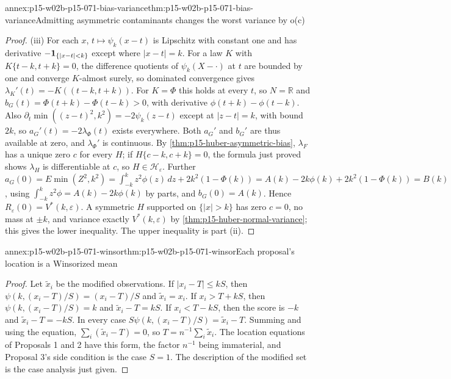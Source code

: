 \begin{annexitem}{annex:p15-w02b-p15-071-bias-variance}{thm:p15-w02b-p15-071-bias-variance}{Admitting asymmetric contaminants changes the worst variance by o(c)}
\begin{proof}
(iii) For each \(x\), \(t\mapsto\psi_k(x-t)\) is Lipschitz with
constant one and has derivative \(-{\bf1}_{\{|x-t|<k\}}\) except where
\(|x-t|=k\). For a law \(K\) with \(K\{t-k,t+k\}=0\), the difference
quotients of \(\psi_k(X-\cdot)\) at \(t\) are bounded by one and converge
\(K\)-almost surely, so dominated convergence gives
\(\lambda_K'(t)=-K((t-k,t+k))\). For \(K=\Phi\) this holds at every \(t\),
so \(N=\mathbb R\) and \(b_G(t)=\Phi(t+k)-\Phi(t-k)>0\), with derivative
\(\phi(t+k)-\phi(t-k)\). Also
\(\partial_t\min((z-t)^2,k^2)=-2\psi_k(z-t)\) except at \(|z-t|=k\),
with bound \(2k\), so \(a_G'(t)=-2\lambda_\Phi(t)\) exists everywhere.
Both \(a_G'\) and \(b_G'\) are thus available at zero, and \(\lambda_\Phi'\)
is continuous. By \cref{thm:p15-huber-asymmetric-bias}, \(\lambda_F\) has a
unique zero \(c\) for every \(H\); if \(H\{c-k,c+k\}=0\), the formula
just proved shows \(\lambda_H\) is differentiable at \(c\), so
\(H\in\mathcal H_\varepsilon\). Further
\(a_G(0)=E\min(Z^2,k^2)=\int_{-k}^kz^2\phi(z)\,dz+2k^2(1-\Phi(k))
=A(k)-2k\phi(k)+2k^2(1-\Phi(k))=B(k)\), using
\(\int_{-k}^kz^2\phi=A(k)-2k\phi(k)\) by parts, and \(b_G(0)=A(k)\).
Hence \(R_\varepsilon(0)=V^*(k,\varepsilon)\).
A symmetric \(H\) supported on \(\{|x|>k\}\) has zero \(c=0\),
no mass at \(\pm k\), and variance exactly \(V^*(k,\varepsilon)\) by
\cref{thm:p15-huber-normal-variance}; this gives the lower inequality.
The upper inequality is part (ii).
\end{proof}
\end{annexitem}

\begin{annexitem}{annex:p15-w02b-p15-071-winsor}{thm:p15-w02b-p15-071-winsor}{Each proposal's location is a Winsorized mean}
\begin{proof}
Let \(\tilde x_i\) be the modified observations. If
\(|x_i-T|\leq kS\), then \(\psi(k,(x_i-T)/S)=(x_i-T)/S\) and
\(\tilde x_i=x_i\). If \(x_i>T+kS\), then \(\psi(k,(x_i-T)/S)=k\) and
\(\tilde x_i-T=kS\). If \(x_i<T-kS\), then the score is \(-k\) and
\(\tilde x_i-T=-kS\). In every case
\(S\psi(k,(x_i-T)/S)=\tilde x_i-T\). Summing and using the equation,
\(\sum_i(\tilde x_i-T)=0\), so \(T=n^{-1}\sum_i\tilde x_i\).
The location equations of Proposals 1 and 2 have this form, the
factor \(n^{-1}\) being immaterial, and Proposal 3's side condition is
the case \(S=1\). The description of the modified set is the case
analysis just given.
\end{proof}
\end{annexitem}

